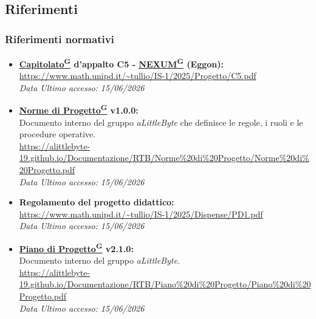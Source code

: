 \documentclass[a4paper,12pt]{article}
\providecommand{\glslink}[2]{\href{https://alittlebyte-19.github.io/Documentazione/glossario.html\#gls-#1}{\underline{#2}\textsuperscript{\scriptsize G}}}
\begin{document}
\subsection{Riferimenti}
\subsubsection{Riferimenti normativi}
\begin{itemize}
    \item \textbf{\glslink{capitolato}{Capitolato} d'appalto C5 - \glslink{nexum}{NEXUM} (Eggon):}\\
    \url{https://www.math.unipd.it/~tullio/IS-1/2025/Progetto/C5.pdf} \\
    \textit{Data Ultimo accesso: 15/06/2026}

    \item \textbf{\glslink{norme-di-progetto}{Norme di Progetto} v1.0.0:}\\
    Documento interno del gruppo \textit{aLittleByte} che definisce le regole, i ruoli e le procedure operative.\\
    \url{https://alittlebyte-19.github.io/Documentazione/RTB/Norme%20di%20Progetto/Norme%20di%20Progetto.pdf}\\
    \textit{Data Ultimo accesso: 15/06/2026}

    \item \textbf{Regolamento del progetto didattico:}\\
    \url{https://www.math.unipd.it/~tullio/IS-1/2025/Dispense/PD1.pdf}\\
    \textit{Data Ultimo accesso: 15/06/2026}

    \item \textbf{\glslink{piano-di-progetto}{Piano di Progetto} v2.1.0:}\\
    Documento interno del gruppo \textit{aLittleByte}.\\
    \url{https://alittlebyte-19.github.io/Documentazione/RTB/Piano%20di%20Progetto/Piano%20di%20Progetto.pdf}\\
    \textit{Data Ultimo accesso: 15/06/2026}
\end{itemize}
\end{document}
